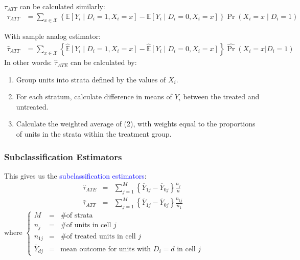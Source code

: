 \documentclass[xcolor=dvipsnames]{beamer}
\renewcommand\r{\right}
\renewcommand\l{\left}
\newcommand\E{\mathbb{E}}
\begin{document}
\begin{frame}

 $\tau_{ATT}$ can be calculated similarly:\\
\footnotesize
\begin{align*}
\tau_{ATT} &= \sum_{x \in \mathcal{X}} \l\{\E[Y_i\mid D_i=1, X_i=x] - \E[Y_i\mid D_i=0, X_i=x]\r\} \Pr(X_i = x \mid D_i=1)
\end{align*}

\small
{} With sample analog estimator:\\
\footnotesize
\begin{align*}
\hat{\tau}_{ATT} &= \sum_{x \in \mathcal{X}} \l\{\hat{\E}[Y_i\mid D_i=1, X_i=x] - \hat{\E}[Y_i\mid D_i=0, X_i=x]\r\} \hat{\Pr}(X_i = x | D_i=1)
\end{align*}
\small
{} In other words: $\hat{\tau}_{ATE}$ can be calculated by:\\
\footnotesize	
	\smallskip
	\begin{enumerate}
	\addtolength{\itemsep}{.25\baselineskip}
	\item[(1)] Group units into strata defined by the values of $X_i$.
	\item[(2)] For each stratum, calculate difference in means of $Y_i$ between the treated and untreated.
	\item[(3)] Calculate the weighted average of (2), with weights equal to the proportions of units in the strata \alert{within the treatment group}. 
	\end{enumerate}
\end{frame}



\begin{frame}
\frametitle{Subclassification Estimators}
 This gives us the \textcolor{Blue}{subclassification estimators}:
\begin{eqnarray*}
\hat\tau_{ATE} & = & \sum_{j=1}^M \l\{ \overline{Y}_{1j} - \overline{Y}_{0j} \r\} \frac{n_j}{n} \\
\hat\tau_{ATT} & = & \sum_{j=1}^M \l\{ \overline{Y}_{1j} - \overline{Y}_{0j} \r\} \frac{n_{1j}}{n_1} 
\end{eqnarray*}
where {\small $\l\{ \begin{array}{lcl} M & = & \text{\# of strata} \\ 
                               n_j & = & \text{\# of units in cell $j$} \\ 
                               n_{1j} & = & \text{\# of treated units in cell $j$} \\
                               \overline{Y}_{dj} & = & \text{mean outcome for units with $D_i=d$ in cell $j$} 
                                \end{array} \r.$}
\end{frame}
\end{document}
